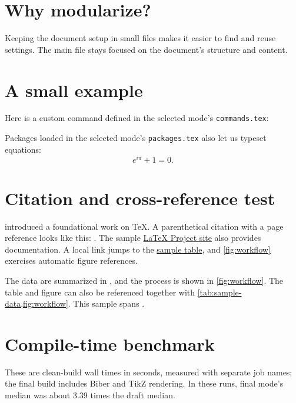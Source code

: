 \documentclass[11pt]{article}
\begin{document}
\maketitle

\section{Why modularize?}\label{sec:why-modularize}
Keeping the document setup in small files makes it easier to find and reuse
settings. The main file stays focused on the document's structure and content.

\section{A small example}
Here is a custom command defined in the selected mode's \texttt{commands.tex}:

Packages loaded in the selected mode's \texttt{packages.tex} also let us typeset equations:
\begin{equation}
	e^{i\pi} + 1 = 0.
\end{equation}

\section{Citation and cross-reference test}\label{sec:reference-test}
\textcite{knuth1984} introduced a foundational work on \TeX. A parenthetical
citation with a page reference looks like this: \parencite[see][chap.~5]{knuth1984}.
The sample \href{https://www.latex-project.org/}{LaTeX Project site} also
provides documentation. A local link jumps to the \hyperref[tab:sample-data]{sample
table}, and \autoref{fig:workflow} exercises automatic figure references.

The data are summarized in , and the process is shown
in \cref{fig:workflow}. The table and figure can also be referenced together
with \cref{tab:sample-data,fig:workflow}. This sample spans
.

\section{Compile-time benchmark}
These are clean-build wall times in seconds, measured with separate job names;
the final build includes Biber and TikZ rendering. In these runs, final mode's
median was about 3.39 times the draft median.
\end{document}
